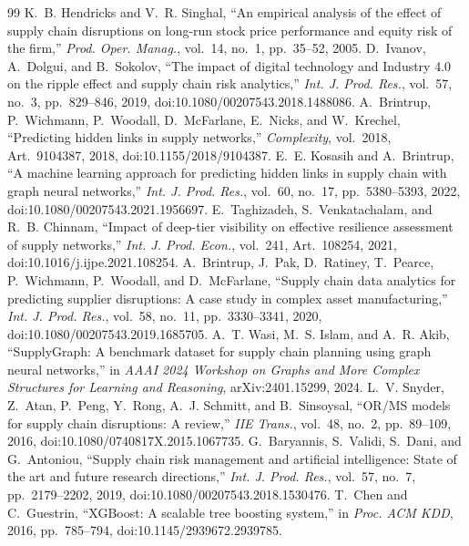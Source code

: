 \documentclass[conference]{IEEEtran}
\begin{document}
\balance
\begin{thebibliography}{99}\footnotesize
{} K.~B. Hendricks and V.~R. Singhal, ``An empirical analysis of the effect of supply chain disruptions on long-run stock price performance and equity risk of the firm,'' \emph{Prod. Oper. Manag.}, vol.~14, no.~1, pp.~35--52, 2005.
 D.~Ivanov, A.~Dolgui, and B.~Sokolov, ``The impact of digital technology and Industry 4.0 on the ripple effect and supply chain risk analytics,'' \emph{Int. J. Prod. Res.}, vol.~57, no.~3, pp.~829--846, 2019, doi:10.1080/00207543.2018.1488086.
 A.~Brintrup, P.~Wichmann, P.~Woodall, D.~McFarlane, E.~Nicks, and W.~Krechel, ``Predicting hidden links in supply networks,'' \emph{Complexity}, vol.~2018, Art.~9104387, 2018, doi:10.1155/2018/9104387.
 E.~E. Kosasih and A.~Brintrup, ``A machine learning approach for predicting hidden links in supply chain with graph neural networks,'' \emph{Int. J. Prod. Res.}, vol.~60, no.~17, pp.~5380--5393, 2022, doi:10.1080/00207543.2021.1956697.
 E.~Taghizadeh, S.~Venkatachalam, and R.~B. Chinnam, ``Impact of deep-tier visibility on effective resilience assessment of supply networks,'' \emph{Int. J. Prod. Econ.}, vol.~241, Art.~108254, 2021, doi:10.1016/j.ijpe.2021.108254.
 A.~Brintrup, J.~Pak, D.~Ratiney, T.~Pearce, P.~Wichmann, P.~Woodall, and D.~McFarlane, ``Supply chain data analytics for predicting supplier disruptions: A case study in complex asset manufacturing,'' \emph{Int. J. Prod. Res.}, vol.~58, no.~11, pp.~3330--3341, 2020, doi:10.1080/00207543.2019.1685705.
 A.~T. Wasi, M.~S. Islam, and A.~R. Akib, ``SupplyGraph: A benchmark dataset for supply chain planning using graph neural networks,'' in \emph{AAAI 2024 Workshop on Graphs and More Complex Structures for Learning and Reasoning}, arXiv:2401.15299, 2024.
 L.~V. Snyder, Z.~Atan, P.~Peng, Y.~Rong, A.~J. Schmitt, and B.~Sinsoysal, ``OR/MS models for supply chain disruptions: A review,'' \emph{IIE Trans.}, vol.~48, no.~2, pp.~89--109, 2016, doi:10.1080/0740817X.2015.1067735.
 G.~Baryannis, S.~Validi, S.~Dani, and G.~Antoniou, ``Supply chain risk management and artificial intelligence: State of the art and future research directions,'' \emph{Int. J. Prod. Res.}, vol.~57, no.~7, pp.~2179--2202, 2019, doi:10.1080/00207543.2018.1530476.
 T.~Chen and C.~Guestrin, ``XGBoost: A scalable tree boosting system,'' in \emph{Proc. ACM KDD}, 2016, pp.~785--794, doi:10.1145/2939672.2939785.

\end{thebibliography}
\end{document}
